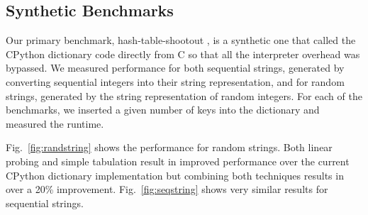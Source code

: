 \documentclass[runningheads,a4paper]{llncs}
\begin{document}
\subsection{Synthetic Benchmarks}

Our primary benchmark, hash-table-shootout \cite{hashshoot}, is a synthetic one that called the CPython dictionary
code directly from C so that all the interpreter overhead was bypassed.  We
measured performance for both sequential strings, generated by converting
sequential integers into their string representation, and for random strings,
generated by the string representation of random integers.  For each of the
benchmarks, we inserted a given number of keys into the dictionary and measured
the runtime.

Fig.~\ref{fig:randstring} shows the performance for random strings.  Both
linear probing and simple tabulation result in improved performance over the
current CPython dictionary implementation but combining both techniques results
in over a 20\% improvement.  Fig.~\ref{fig:seqstring} shows very similar
results for sequential strings.



\end{document}
